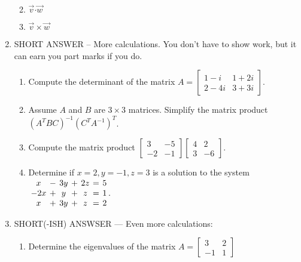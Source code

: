 \documentclass[12pt]{article}
\newcommand{\points}[1]{\marginpar{\hspace{24pt}[#1]}}
\newcommand{\dotp}{\boldsymbol{\cdot}}
\newcommand{\bbm}{\begin{bmatrix}}
\newcommand{\ebm}{\end{bmatrix}}
\begin{document}
\begin{enumerate}
\begin{enumerate}
\vspace{0.9in}

 \item $\vec{v}\dotp\vec{w}$ \points{2}

\vspace{0.9in}

 \item $\vec{v}\times\vec{w}$ \points{3}
\end{enumerate}


\newpage

\item SHORT ANSWER -- More calculations. You don't have to show work, but it can earn you part marks if you do.

\begin{enumerate}
 \item Compute the determinant of the matrix $A = \bbm 1-i & 1+2i\\2-4i & 3+3i\ebm$. \points{3}

\vspace{2in}

 \item Assume $A$ and $B$ are $3\times 3$ matrices. Simplify the matrix product $(A^TBC)^{-1}(C^TA^{-1})^T$. \points{3}

\vspace{1.5in}

 \item Compute the matrix product $\bbm 3&-5\\-2&-1\ebm\bbm 4&2\\3&-6\ebm$. \points{3}

\vspace{1.5in}

 \item Determine if $x=2, y=-1, z=3$ is a solution to the system $\arraycolsep=2pt\begin{array}{ccccccc}x&-&3y&+&2z&=&5\\-2x&+&y&+&z&=&1\\x&+&3y&+&z&=&2\end{array}.$\points{3}

\end{enumerate}
\newpage

\item SHORT(-ISH) ANSWSER --- Even more calculations:

\begin{enumerate}
 \item Determine the eigenvalues of the matrix $A=\bbm 3&2\\-1&1\ebm$\points{4}


\end{enumerate}
\end{enumerate}
\end{document}
